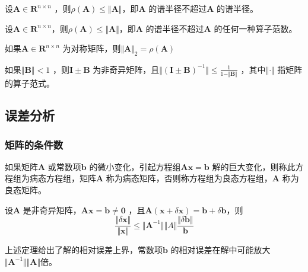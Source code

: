 \documentclass[a4paper]{article}
\begin{document}
\begin{definition}
	设$\mathbf{A} \in \mathbf{R}^{n \times n}$ ，则$\rho(\mathbf{A}) \le \Vert \mathbf{A} \Vert$，即$\mathbf{A}$ 的谱半径不超过$\mathbf{A}$ 的谱半径。
\end{definition}

\begin{theorem}
	设$\mathbf{A} \in \mathbf{R}^{n \times n}$，则$\rho(\mathbf{A}) \le \Vert \mathbf{A} \Vert$，即$\mathbf{A}$ 的谱半径不超过$\mathbf{A}$ 的任何一种算子范数。
\end{theorem}

\begin{theorem}
	如果$\mathbf{A} \in \mathbf{R}^{n \times n}$ 为对称矩阵，则$\Vert \mathbf{A} \Vert_2 = \rho(\mathbf{A})$
\end{theorem}

\begin{theorem}
	如果$\Vert \mathbf{B} \Vert < 1$ ，则$\mathbf{I \pm B}$ 为非奇异矩阵，且$\Vert (\mathbf{I \pm B})^{-1} \Vert \le \frac{1}{1 - \Vert \mathbf{B} \Vert}$ ，其中$\Vert \cdot \Vert$ 指矩阵的算子范式。
\end{theorem}

\subsection{误差分析}
\subsubsection{矩阵的条件数}
\begin{definition}
	如果矩阵$\mathbf{A}$ 或常数项$\mathbf{b}$ 的微小变化，引起方程组$\mathbf{Ax} = \mathbf{b}$ 解的巨大变化，则称此方程组为病态方程组，矩阵$\mathbf{A}$ 称为病态矩阵，否则称方程组为良态方程组，$\mathbf{A}$ 称为良态矩阵。
\end{definition}

\begin{theorem}
	设$\mathbf{A}$ 是非奇异矩阵，$\mathbf{Ax} = \mathbf{b} \neq \mathbf{0}$ ，且$\mathbf{A}(\mathbf{x} + \delta \mathbf{x}) = \mathbf{b} + \delta \mathbf{b}$，则
	\[
	\frac{\Vert \delta \mathbf{x} \Vert}{\Vert \mathbf{x} \Vert} \le \Vert \mathbf{A}^{-1} \Vert \Vert A \Vert \frac{\Vert \delta \mathbf{b} \Vert}{\mathbf{b}}
	\] 
\end{theorem}
上述定理给出了解的相对误差上界，常数项$\mathbf{b}$ 的相对误差在解中可能放大$\Vert \mathbf{A}^{-1} \Vert \Vert \mathbf{A} \Vert$倍。
\end{document}

